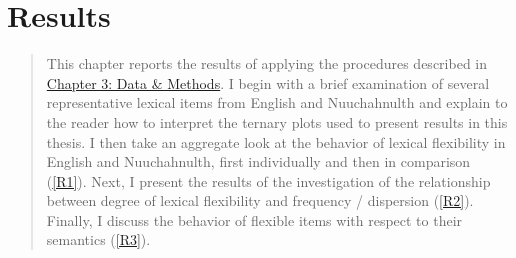 \chapter{Results}
\label{ch:results}

\blockquote{This chapter reports the results of applying the procedures described in \hyperref[ch:methods]{Chapter 3: Data \& Methods}. I begin with a brief examination of several representative lexical items from English and Nuuchahnulth and explain to the reader how to interpret the ternary plots used to present results in this thesis. I then take an aggregate look at the behavior of lexical flexibility in English and Nuuchahnulth, first individually and then in comparison (\ref{R1}). Next, I present the results of the investigation of the relationship between degree of lexical flexibility and frequency / dispersion (\ref{R2}). Finally, I discuss the behavior of flexible items with respect to their semantics (\ref{R3}).}
